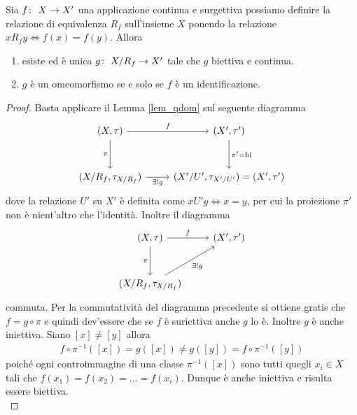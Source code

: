 \begin{theorem}
	Sia  $f \colon\ X \rightarrow X'$ una applicazione continua e surgettiva possiamo definire la relazione di equivalenza $R_f$ sull'insieme $X$ ponendo la relazione $xR_fy \Leftrightarrow f(x) = f(y)$. Allora 
	\begin{enumerate}
		\item esiste ed è unica $g \colon\ X/R_f \rightarrow X'$ tale che $g$ biettiva e continua.
		\item $g$ è un omeomorfismo se e solo se $f$ è un identificazione.
	\end{enumerate}
\end{theorem}
\begin{proof}
	Basta applicare il Lemma \ref{lem_qdom} sul seguente diagramma
	\begin{equation}
	\begin{tikzcd}[row sep = 3em]
		(X, \tau) \arrow[swap]{d}{\pi} \arrow{r}{f} & (X', \tau') \arrow{d}{\pi' = \operatorname{Id}}\\
		(X/R_f, \tau_{X/R_f}) \arrow[swap]{r}{\exists! g} & (X'/U', \tau_{X'/U'}) = (X', \tau')
	\end{tikzcd}	
	\end{equation}
	dove la relazione $U'$ su $X'$ è definita come $xU'y \Leftrightarrow x = y$, per cui la proiezione $\pi'$ non è nient'altro che l'identità. Inoltre il diagramma
	\begin{equation}
	\begin{tikzcd}[row sep = 3em]
		(X, \tau) \arrow[swap]{d}{\pi} \arrow{r}{f} & (X', \tau') \\
		(X/R_f, \tau_{X/R_f}) \arrow[swap]{ru}{\exists! g} &
	\end{tikzcd}	
	\end{equation}
	commuta. 
	Per la commutatività del diagramma precedente si ottiene gratis che $f = g \circ \pi$ e quindi dev'essere che se $f$ è suriettiva anche $g$ lo è. Inoltre $g$ è anche iniettiva. Siano $\left[x\right] \neq \left[y\right]$ allora 
	\begin{equation}
	\begin{aligned}
		f \circ \pi^{-1} (\left[x\right]) = g(\left[x\right]) \neq g(\left[y\right]) = f \circ \pi^{-1}(\left[y\right])
	\end{aligned}
	\end{equation}	
	poiché ogni controimmagine di una classe $\pi^{-1}(\left[x\right])$ sono tutti quegli $x_i \in X$ tali che $f(x_1) = f(x_2) = \dots = f(x_i)$. Dunque è anche iniettiva e risulta essere biettiva.\\
	

\end{proof}
